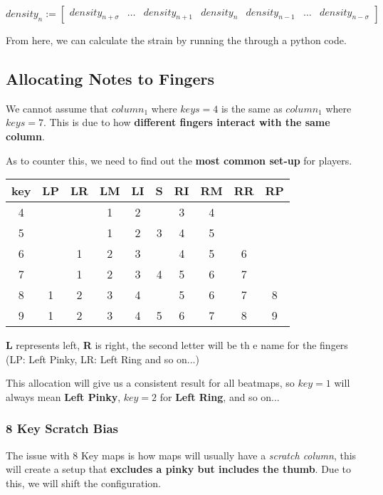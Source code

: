 $$
density_n :=
\begin{bmatrix}
	density_{n+\sigma} & \dots & density_{n+1} & density_{n} & density_{n-1} & \dots & density_{n-\sigma} 
\end{bmatrix}
$$ 

From here, we can calculate the strain by running the through a python code.
\subsection{Allocating Notes to Fingers}

We cannot assume that $column_1$ where $keys = 4$ is the same as $column_1$ where $keys = 7$. This is due to how \textbf{different fingers interact with the same column}.

As to counter this, we need to find out the \textbf{most common set-up} for players.

\begin{center}
	\begin{tabular}{|c|c|c|c|c|c|c|c|c|c|} 
	\hline
	key & LP & LR & LM & LI & S  & RI & RM & RR & RP\\
	\hline
	4   & {} & {} & 1  & 2  & {} & 3  & 4  & {} & {}\\
	5   & {} & {} & 1  & 2  & 3  & 4  & 5  & {} & {}\\
	6   & {} & 1  & 2  & 3  & {} & 4  & 5  & 6  & {}\\
	7   & {} & 1  & 2  & 3  & 4  & 5  & 6  & 7  & {}\\
	8   & 1  & 2  & 3  & 4  & {} & 5  & 6  & 7  & 8\\
	9   & 1  & 2  & 3  & 4  & 5  & 6  & 7  & 8  & 9\\
	\hline
\end{tabular}
\end{center}

\textbf{L} represents left, \textbf{R} is right, the second letter will be th	e name for the fingers (LP: Left Pinky, LR: Left Ring and so on...)

This allocation will give us a consistent result for all beatmaps, so $key=1$ will always mean \textbf{Left Pinky}, $key=2$ for \textbf{Left Ring}, and so on...

\subsubsection{8 Key Scratch Bias}
The issue with 8 Key maps is how maps will usually have a \textit{scratch column}, this will create a setup that \textbf{excludes a pinky but includes the thumb}. Due to this, we will shift the configuration.

